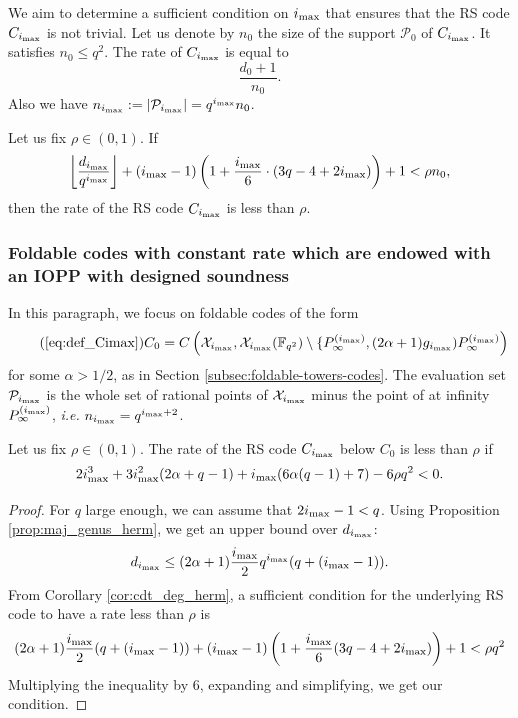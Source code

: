 \documentclass[a4paper,USenglish,autoref]{lipics-v2021}
\newcommand\F{\mathbb{F}}
\newcommand{\size}[1]{\left|#1\right|}
\newcommand\calX{\mathcal{X}}
\newcommand\calP{\mathcal{P}}
\newcommand{\cd}{\cdot}
\newcommand{\ii}{i_{\rm{max}}}
\begin{document}
We aim to determine a sufficient condition on $\ii$ that ensures that the RS code $C_{\ii}$ is not trivial. Let us denote by $n_0$ the size of the support $\calP_0$ of $C_{\ii}$. It satisfies $n_0 \leq q^2$. The rate of $C_ {\ii}$ is equal to \[\frac{d_0+1}{n_0}.\] Also we have $n_{\ii} := \size{\calP_{\ii}} = q^{\ii}n_0$.




\begin{corollary}\label{cor:cdt_deg_herm}
	Let us fix $\rho \in (0,1)$. If
	\[ \left\lfloor \dfrac{d_{\ii}}{q^{\ii}}\right\rfloor +  (\ii-1)\left( 1+\frac{\ii}{6} \cd \left(3q-4 + 2\ii\right)\right) +1 < \rho n_0,\]
	then the rate of the RS code $C_{\ii}$ is less than $\rho$.
\end{corollary}

\subsubsection{Foldable codes with constant rate which are endowed with an IOPP with designed soundness}
In this paragraph, we focus on foldable codes of the form 
\begin{equation}\tag{\ref{eq:def_Cimax}}
	C_0= C\left(\calX_{\ii},\calX_{\ii}(\F_{q^2})\setminus \{P^{(\ii)}_{\infty} , (2\alpha+1)g_{\ii})P^{(\ii)}_{\infty}\right)
\end{equation}
for some $\alpha > 1/2$, as in Section \ref{subsec:foldable-towers-codes}. The evaluation set $\calP_{\ii}$ is the whole set of rational points of $\calX_{\ii}$ minus the point of at infinity $P_\infty^{(\ii)}$, \textit{i.e.} $n_{\ii}=q^{\ii +2}$.

\begin{proposition}
	Let us fix $\rho \in (0,1)$. The rate of the RS code $C_{\ii}$ below $C_0$ is less than $\rho$ if 
	\[2\ii^3 + 3\ii^2(2\alpha+q-1) + \ii (6\alpha(q-1)+7) - 6\rho q^2 <0.\]
\end{proposition}

\begin{proof}
	For $q$ large enough, we can assume that $2\ii-1<q$. Using Proposition \ref{prop:maj_genus_herm}, we get an upper bound over $d_{\ii}$: 
	\[ 
	d_{\ii} \leq (2\alpha+1)\dfrac{\ii}{2}q^{\ii}(q+(\ii-1)).
	\]
	From Corollary \ref{cor:cdt_deg_herm}, a sufficient condition for the underlying RS code to have a rate less than $\rho$ is    
	\[
	(2\alpha+1)\dfrac{\ii}{2}(q+(\ii-1)) + (\ii-1)\left(1+\frac{\ii}{6}(3q-4+2\ii)\right)+1 < \rho q^2
	\]    
	Multiplying the inequality by $6$, expanding and simplifying, we get our condition.
\end{proof}
\end{document}
